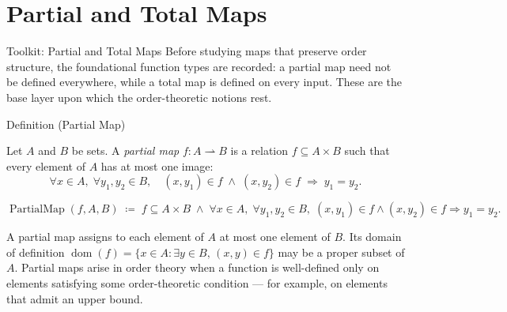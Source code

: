 
\section{Partial and Total Maps}
\label{sec:partial-total-maps}

\begin{toolkitbox}{Toolkit: Partial and Total Maps}
Before studying maps that preserve order structure, the foundational
function types are recorded: a partial map need not be defined everywhere,
while a total map is defined on every input.  These are the base layer
upon which the order-theoretic notions rest.
\end{toolkitbox}


\begin{definitionbox}{Definition (Partial Map)}
\begin{definition}
\label{def:partial-map}
Let $A$ and $B$ be sets.  A \emph{partial map} $f : A \rightharpoonup B$
is a relation $f \subseteq A \times B$ such that every element of $A$ has
at most one image:
\[
\forall x \in A,\; \forall y_1, y_2 \in B,\quad
(x, y_1) \in f \;\land\; (x, y_2) \in f
\;\Longrightarrow\; y_1 = y_2.
\]
\end{definition}
\end{definitionbox}

\begin{remark*}
\[
\operatorname{PartialMap}(f, A, B)
\;\coloneqq\;
f \subseteq A \times B
\;\land\;
\forall x \in A,\; \forall y_1, y_2 \in B,\;
(x,y_1) \in f \land (x,y_2) \in f \Rightarrow y_1 = y_2.
\]
\end{remark*}

\begin{remark*}[Interpretation]
A partial map assigns to each element of $A$ at most one element of $B$.
Its domain of definition
$\operatorname{dom}(f) = \{x \in A : \exists y \in B,\, (x,y) \in f\}$
may be a proper subset of $A$.  Partial maps arise in order theory when
a function is well-defined only on elements satisfying some order-theoretic
condition — for example, on elements that admit an upper bound.
\end{remark*}

